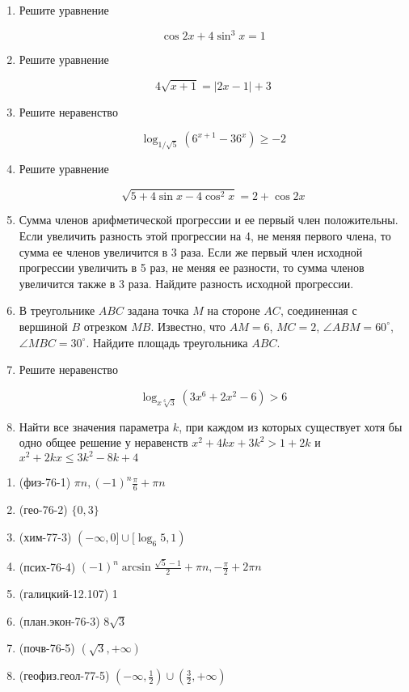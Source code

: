 \documentclass[11pt,a5paper]{report}
\begin{document}
\begin{enumerate}

\item Решите уравнение

$$ \cos 2x+4\sin^3 x = 1 $$

\item Решите уравнение

$$ 4\sqrt{x+1} = |2x-1|+3 $$

\item Решите неравенство

$$ \log_{1/\sqrt{5}}(6^{x+1}-36^x) \geqslant -2 $$

\item Решите уравнение

$$ \sqrt{5+4\sin x-4\cos^2 x} = 2 + \cos 2x $$

\item Сумма членов арифметической прогрессии и ее первый член положительны. Если увеличить разность этой прогрессии на 4, не меняя первого члена, то сумма ее членов увеличится в 3 раза. Если же первый член исходной прогрессии увеличить в 5 раз, не меняя ее разности, то сумма членов увеличится также в 3 раза. Найдите разность исходной прогрессии.

\item В треугольнике $ABC$ задана точка $M$ на стороне $AC$, соединенная с вершиной $B$ отрезком $MB$. Известно, что $AM = 6$, $MC = 2$, $\angle ABM = 60^{\circ}$, $\angle MBC = 30^{\circ}$. Найдите площадь треугольника $ABC$.

\item Решите неравенство

$$ \log_{x\sqrt[6]{3}}(3x^6+2x^2-6) > 6 $$

\item Найти все значения параметра $k$, при каждом из которых существует хотя бы одно общее решение у неравенств $x^2 + 4kx + 3k^2 > 1 + 2k$ и $x^2 + 2kx \leqslant 3k^2 - 8k + 4$

\end{enumerate}
\newpage

\begin{enumerate}

\item (физ-76-1) $\pi n, (-1)^n \frac{\pi}{6} + \pi n$

\item (гео-76-2) $\{0, 3\}$

\item (хим-77-3) $(-\infty, 0] \cup [\log_6 5, 1)$

\item (псих-76-4) $(-1)^n\arcsin\frac{\sqrt{5}-1}{2}+\pi n, -\frac{\pi}{2} + 2\pi n$

\item (галицкий-12.107) 1

\item (план.экон-76-3) $8\sqrt{3}$

\item (почв-76-5) $(\sqrt{3}, +\infty)$

\item (геофиз.геол-77-5) $(-\infty, \frac{1}{2})\cup(\frac{3}{2},+\infty)$
\end{enumerate}
\end{document}
